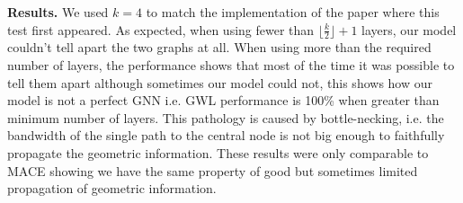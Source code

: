 \textbf{Results. } We used $k=4$ to match the implementation of the paper where this test first appeared. As expected, when using fewer than $\lfloor \frac k 2 \rfloor + 1$ layers, our model couldn't tell apart the two graphs at all. When using more than the required number of layers, the performance shows that most of the time it was possible to tell them apart although sometimes our model could not, this shows how our model is not a perfect GNN i.e. GWL performance is 100\% when greater than minimum number of layers. This pathology is caused by bottle-necking, i.e. the bandwidth of the single path to the central node is not big enough to faithfully propagate the geometric information. These results were only comparable to MACE showing we have the same property of good but sometimes limited propagation of geometric information. 


